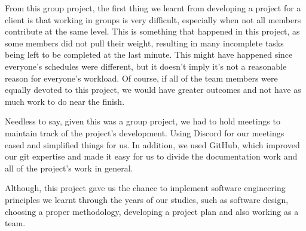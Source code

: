     From this group project, the first thing we learnt from developing a project for a client is that working in groups is very difficult, especially when not all members contribute at the same level. This is something that happened in this project, as some members did not pull their weight, resulting in many incomplete tasks being left to be completed at the last minute. This might have happened since everyone's schedules were different, but it doesn't imply it's not a reasonable reason for everyone's workload. Of course, if all of the team members were equally devoted to this project, we would have greater outcomes and not have as much work to do near the finish.

    Needless to say, given this was a group project, we had to hold meetings to maintain track of the project's development. Using Discord for our meetings eased and simplified things for us. In addition, we used GitHub, which improved our git expertise and made it easy for us to divide the documentation work and all of the project's work in general.

    Although, this project gave us the chance to implement software engineering principles we learnt through the years of our studies, such as software design, choosing a proper methodology, developing a project plan and also working as a team.
